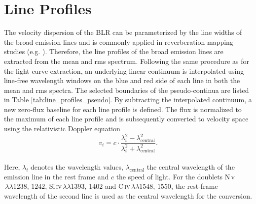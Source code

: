 \section{Line Profiles}
\label{sec:line_profiles}
The velocity dispersion of the BLR can be parameterized by the line widths of the broad emission lines \parencite{peterson2004} and is commonly applied in reverberation mapping studies (e.g. \cite{kollatschny1997balmer, denney2006ngc4593}). Therefore, the line profiles of the broad emission lines are extracted from the mean and rms spectrum. Following the same procedure as for the light curve extraction, an underlying linear continuum is interpolated using line-free wavelength windows on the blue and red side of each line in both the mean and rms spectra. The selected boundaries of the pseudo-continua are listed in Table \ref{tab:line_profiles_pseudo}. By subtracting the interpolated continuum, a new zero-flux baseline for each line profile is defined. The flux is normalized to the maximum of each line profile and is subsequently converted to velocity space using the relativistic Doppler equation \parencite{sher1968relativistic} \\ 
\begin{equation}
	\label{eqn:velocity_space}
	v_i = c \cdot \frac{\lambda_i^2 - \lambda_\mathrm{central}^2}{\lambda_i^2 + \lambda_\mathrm{central}^2}.
\end{equation}\\
Here, $\lambda_i$ denotes the wavelength values, $\lambda_\mathrm{central}$ the central wavelength of the emission line in the rest frame and $c$ the speed of light. For the doublets N\,\textsc{v}$\,\lambda\lambda 1238,\,1242 $, Si\,\textsc{iv}$\,\lambda\lambda 1393,\,1402 $ and C\,\textsc{iv}$\,\lambda\lambda 1548,\,1550$, the rest-frame wavelength of the second line is used as the central wavelength for the conversion.

